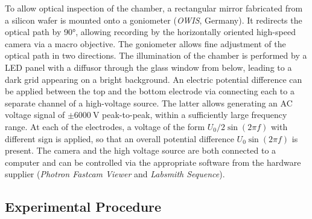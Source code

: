 \documentclass{jfm_arxiv}
\begin{document}
To allow optical inspection of the chamber, a rectangular mirror fabricated from a silicon wafer is mounted onto a goniometer (\textit{OWIS}, Germany). It redirects the optical path by \ang{90}, allowing recording by the horizontally oriented high-speed camera via a macro objective.
The goniometer allows fine adjustment of the optical path in two directions.
The illumination of the chamber is performed by a LED panel with a diffusor through the glass window from below, leading to a dark grid appearing on a bright background.
An electric potential difference can be applied between the top and the bottom electrode via connecting each to a separate channel of a high-voltage source. The latter allows generating an AC voltage signal of $\pm \SI{6000}{\volt}$ peak-to-peak, within a sufficiently large frequency range.
At each of the electrodes, a voltage of the form $ U_0/2 \sin \left( 2 \pi f \right)$ with different sign is applied, so that an overall potential difference $U_0\sin \left( 2 \pi f \right)$ is present.
The camera and the high voltage source are both connected to a computer and can be controlled via the appropriate software from the hardware supplier (\textit{Photron Fastcam Viewer} and \textit{Labsmith Sequence}).


\subsection{Experimental Procedure}
\label{sec:experimentalProcedure}
\end{document}
